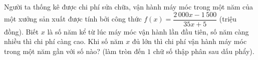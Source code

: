 \begin{bt}%
	Người ta thống kê được chi phí sửa chữa, vận hành máy móc trong một năm của một xưởng sản xuất được tính bởi công thức $f\left( x \right)=\dfrac{2\,000x-1\,500}{35x+5}$ (triệu đồng). Biết $x$ là số năm kể từ lúc máy móc vận hành lần đầu tiên, số năm càng nhiều thì chi phí càng cao. Khi số năm $x$ đủ lớn thì chi phí vận hành máy móc trong một năm gần với số nào? (làm tròn đến $1$ chữ số thập phân sau dấu phẩy).\\
\end{bt}

